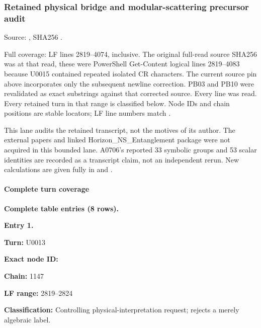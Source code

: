 \subsubsection{Retained physical bridge and modular-scattering precursor
audit}\label{retained-physical-bridge-and-modular-scattering-precursor-audit}

Source:
\protect{},
SHA256
\protect{}.

Full coverage: LF lines 2819--4074, inclusive. The original full-read
source SHA256 was
\protect{}
at that read, these were PowerShell Get-Content logical lines 2819--4083
because U0015 contained repeated isolated CR characters. The current
source pin above incorporates only the subsequent newline correction.
PB03 and PB10 were revalidated as exact substrings against that
corrected source. Every line was read. Every retained turn in that range
is classified below. Node IDs and chain positions are stable locators;
LF line numbers match \protect{}.

This lane audits the retained transcript, not the motives of its author.
The external papers and linked Horizon\_NS\_Entanglement package were
not acquired in this bounded lane. A0706's reported 33 symbolic groups
and 53 scalar identities are recorded as a transcript claim, not an
independent rerun. New calculations are given fully in
\protect{} and \protect{}.

\paragraph{Complete turn coverage}\label{complete-turn-coverage-1}

\textbf{Complete table entries (8 rows).}


\textbf{Entry 1.}

\textbf{Turn:} U0013

\textbf{Exact node ID:}
\protect{}

\textbf{Chain:} 1147

\textbf{LF range:} 2819--2824

\textbf{Classification:} Controlling physical-interpretation request;
rejects a merely algebraic label.


